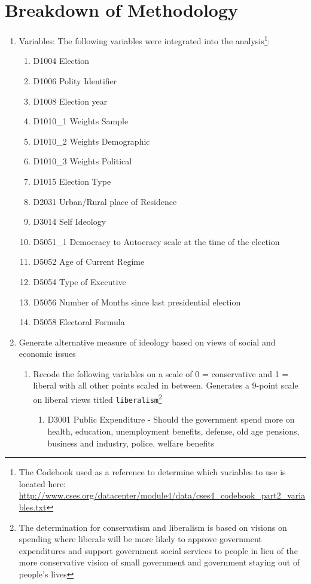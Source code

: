 \documentclass[12pt]{article}
\newcommand\txt{\texttt}
\begin{document}
\section{Breakdown of Methodology}

\begin{enumerate}
\item Variables: The following variables were integrated into the analysis\footnote{The Codebook used as a reference to determine which variables to use is located here: \url{http://www.cses.org/datacenter/module4/data/cses4_codebook_part2_variables.txt}}:
\begin{enumerate}
	\item D1004 Election
	\item D1006 Polity Identifier
	\item D1008 Election year
	\item D1010\_1 Weights Sample
	\item D1010\_2 Weights Demographic
	\item D1010\_3 Weights Political 
	\item D1015 Election Type
	\item D2031 Urban/Rural place of Residence
	\item D3014 Self Ideology
	\item D5051\_1 Democracy to Autocracy scale at the time of the election
	\item D5052 Age of Current Regime
	\item D5054 Type of Executive
	\item D5056 Number of Months since last presidential election
	\item D5058 Electoral Formula
\end{enumerate} 
\item Generate alternative measure of ideology based on views of social and economic issues
\begin{enumerate}
	\item Recode the following variables on a scale of 0 = conservative and 1 = liberal with all other points scaled in between. Generates a 9-point scale on liberal views titled {\txt{liberalism}}\footnote{The determination for conservatism and liberalism is based on visions on spending where liberals will be more likely to approve government expenditures and support government social services to people in lieu of the more conservative vision of small government and government staying out of people's lives}
	\begin{enumerate}
		\item D3001 Public Expenditure - Should the government spend more on health, education, unemployment benefits, defense, old age pensions, business and industry, police, welfare benefits

\end{enumerate}
\end{enumerate}
\end{enumerate}
\end{document}
